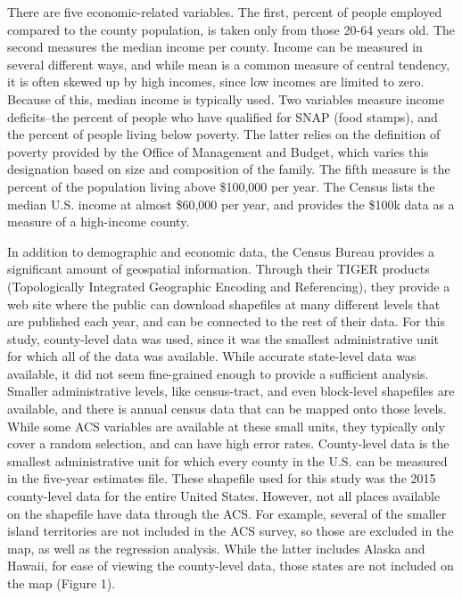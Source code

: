 \documentclass[sigconf]{acmart}
\begin{document}
There are five economic-related variables.  The first, percent of people employed compared to the county population, is taken only from those 20-64 years old.  The second measures the median income per county.  Income can be measured in several different ways, and while mean is a common measure of central tendency, it is often skewed up by high incomes, since low incomes are limited to zero.  Because of this, median income is typically used.  Two variables measure income deficits--the percent of people who have qualified for SNAP (food stamps), and the percent of people living below poverty.  The latter relies on the definition of poverty provided by the Office of Management and Budget, which varies this designation based on size and composition of the family.  The fifth measure is the percent of the population living above \$100,000  per year. The Census lists the median U.S. income at almost \$60,000 per year, and provides the \$100k data as a measure of a high-income county.

In addition to demographic and economic data, the Census Bureau provides a significant amount of geospatial information.  Through their TIGER products (Topologically Integrated Geographic Encoding and Referencing), they provide a web site where the public can download shapefiles at many different levels that are published each year, and can be connected to the rest of their data. \cite{tiger} For this study, county-level data was used, since it was the smallest administrative unit for which all of the data was available.  While accurate state-level data was available, it did not seem fine-grained enough to provide a sufficient analysis.  Smaller administrative levels, like census-tract, and even block-level shapefiles are available, and there is annual census data that can be mapped onto those levels.  While  some ACS variables are available at these small units, they typically only cover a random selection, and can have high error rates.  County-level data is the smallest administrative unit for which every county in the U.S. can be measured in the five-year estimates file.  These shapefile used for this study was the 2015 county-level data for the entire United States.  However, not all places available on the shapefile have data through the ACS.  For example, several of the smaller island territories are not included in the ACS survey, so those are excluded in the map, as well as the regression analysis.  While the latter includes Alaska and Hawaii, for ease of viewing the county-level data, those states are not included on the map (Figure 1).
\end{document}
